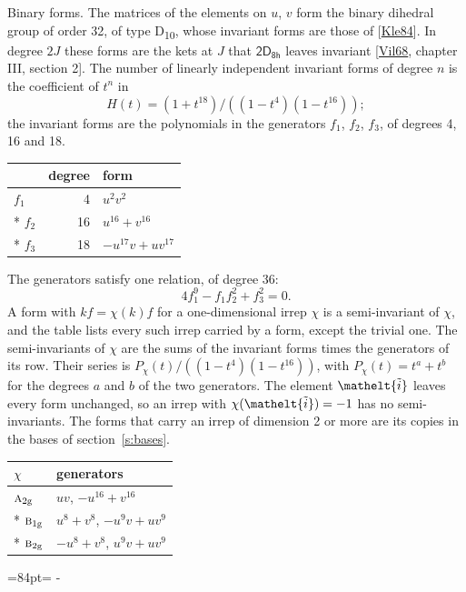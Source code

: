 \documentclass[10pt,a4paper]{article}
\makeatletter
\renewcommand\paragraph{\@startsection{paragraph}{4}{\z@}{1.5ex plus .5ex minus .2ex}{-1em}%
  {\normalfont\small\sffamily\bfseries\color{parttitle}}}
\newcommand{\needspace}[1]{\par\penalty-100\begingroup\dimen0=#1\relax\dimen2=\pagegoal
  \advance\dimen2-\pagetotal\ifdim\dimen0>\dimen2\relax\ifdim\dimen2>0pt\vfil\break\fi\fi
  \endgroup}
\numberwithin{equation}{section}
\newcommand{\eltfont}[1]{{\let\sigma\eltsigma\mathelt{#1}}}
\newcommand{\grp}[1]{\mathsf{#1}}
\newcommand{\irr}[1]{\text{\normalfont\scshape #1}}
\newcommand{\elt}[1]{\eltfont{#1}}
\newcommand{\ptag}[1]{\mathrm{#1}}
\newcommand{\lift}[1]{\tilde{#1}}
\makeatother
\begin{document}
\paragraph{Binary forms.}
The matrices of the elements on $u$, $v$ form the binary dihedral group of order 32, of type D\textsubscript{10}, whose invariant forms are those of [\href{../../../REFERENCES.pdf\#ref.Kle84}{Kle84}]. In degree $2J$ these forms are the kets at $J$ that $\grp{2D_{8h}}$ leaves invariant [\href{../../../REFERENCES.pdf\#ref.Vil68}{Vil68}, chapter III, section 2]. \label{n:head.degree}\label{n:head.form}The number of linearly independent invariant forms of degree $n$ is the coefficient of $t^n$ in
\begin{equation}\label{e:molien}H(t) = (1 + t^{18})/((1-t^{4})(1-t^{16}));\end{equation}
the invariant forms are the polynomials in the generators $f_1$, $f_2$, $f_3$, of degrees 4, 16 and 18.
{\small\begin{longtable}{@{}lrl@{}}\toprule
& degree & form\\\midrule\endhead
\bottomrule\endfoot\endlastfoot
$f_{1}$ & 4 & $u^{2}v^{2}$\\*
$f_{2}$ & 16 & $u^{16} + v^{16}$\\*
$f_{3}$ & 18 & $-u^{17}v + uv^{17}$\\
\bottomrule\end{longtable}}
The generators satisfy one relation, of degree 36:
\begin{equation}\label{e:relation}4f_{1}^{9} - f_{1}f_{2}^{2} + f_{3}^{2} = 0.\end{equation}
A form with $k f = \chi(k) f$ for a one-dimensional irrep $\chi$ is a semi-invariant of $\chi$, and the table lists every such irrep carried by a form, except the trivial one. \label{n:head.generators}The semi-invariants of $\chi$ are the sums of the invariant forms times the generators of its row. Their series is $P_\chi(t)/((1-t^{4})(1-t^{16}))$, with $P_\chi(t) = t^{a} + t^{b}$ for the degrees $a$ and $b$ of the two generators. The element $\elt{\lift{i}}$ leaves every form unchanged, so an irrep with $\chi(\elt{\lift{i}}) = -1$ has no semi-invariants. The forms that carry an irrep of dimension 2 or more are its copies in the bases of section~\ref{s:bases}.
{\small\begin{longtable}{@{}ll@{}}\toprule
$\chi$ & generators\\\midrule\endhead
\bottomrule\endfoot\endlastfoot
$\irr{a}_{2\ptag{g}}$ & $uv$, $-u^{16} + v^{16}$\\*
$\irr{b}_{1\ptag{g}}$ & $u^{8} + v^{8}$, $-u^{9}v + uv^{9}$\\*
$\irr{b}_{2\ptag{g}}$ & $-u^{8} + v^{8}$, $u^{9}v + uv^{9}$\\
\bottomrule\end{longtable}}
\needspace{84pt}
\end{document}
